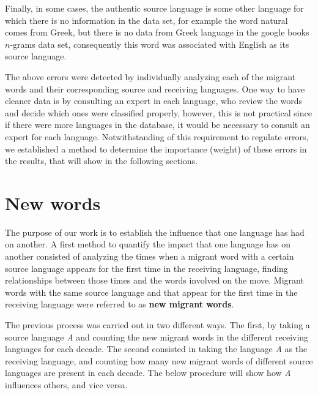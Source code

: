 \documentclass[10pt,letterpaper]{article} %
\begin{document}
	 Finally, in some cases, the authentic source language is some other language for which there is no information in the data set, for example the word  natural comes from Greek, but there is no data from Greek language in the google books $n$-grams data set, consequently this word was associated with English as its source language.
	
	The above errors were detected by individually analyzing each of the migrant words and their corresponding source and receiving languages. One way to have cleaner data is by consulting an expert in each language, who review the words and decide which ones were classified properly, however, this is not practical since if there were more languages in the database, it would be necessary to consult an expert for each language. Notwithstanding of this requirement to  regulate errors, we established a method to determine the importance (weight) of these errors in the results, that will show in the following sections. 
	
	\section*{New words} %
	The purpose of our work is to establish the influence that one
	language has had on another.
	A first method to quantify the impact
	that one language has on another consisted of analyzing the
	times when a migrant word with a certain source language appears for the first
	time in the receiving language, finding relationships between those times and
	the words involved on the move. Migrant words with the same source language and
	that appear for the first time in the receiving language were referred to as
	\textbf{new migrant words}. 
	
	The previous process was carried out in two different ways. The first, by
	taking a source language \textit{A} and counting the new migrant words in the
	different receiving languages for each decade. The second consisted in taking
	the language \textit{A} as the receiving language, and counting how many new
	migrant words of different source languages are present in each decade. The
	below procedure will show how \textit{A} influences others, and vice versa.
	
	
	
\end{document}

